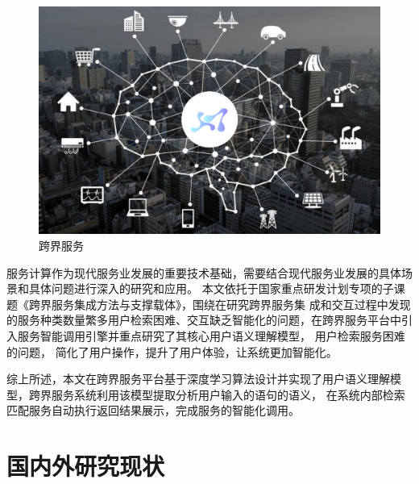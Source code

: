 \begin{figure}[htbp]
  \centering
  \includegraphics[scale=0.4]{./images/kuajiefuwu.png}
  \caption{跨界服务}
  \label{fig:kuajiefuwu}
\end{figure}


服务计算作为现代服务业发展的重要技术基础，需要结合现代服务业发展的具体场景和具体问题进行深入的研究和应用。
本文依托于国家重点研发计划专项的子课题《跨界服务集成方法与支撑载体》，围绕在研究跨界服务集
成和交互过程中发现的服务种类数量繁多用户检索困难、交互缺乏智能化的问题，在跨界服务平台中引入服务智能调用引擎并重点研究了其核心用户语义理解模型，
用户检索服务困难的问题，
简化了用户操作，提升了用户体验，让系统更加智能化。

综上所述，本文在跨界服务平台基于深度学习算法设计并实现了用户语义理解模型，跨界服务系统利用该模型提取分析用户输入的语句的语义，
在系统内部检索匹配服务自动执行返回结果展示，完成服务的智能化调用。

\section{国内外研究现状}

